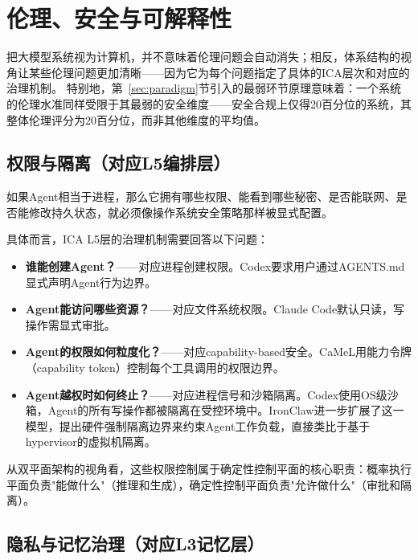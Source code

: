 \section{伦理、安全与可解释性}
\label{sec:ethics}

把大模型系统视为计算机，并不意味着伦理问题会自动消失；相反，体系结构的视角让某些伦理问题更加清晰——因为它为每个问题指定了具体的ICA层次和对应的治理机制。
特别地，第~\ref{sec:paradigm}节引入的最弱环节原理意味着：一个系统的伦理水准同样受限于其最弱的安全维度——安全合规上仅得20百分位的系统，其整体伦理评分为20百分位，而非其他维度的平均值。

\subsection{权限与隔离（对应L5编排层）}
\label{sec:ethics-permission}

如果Agent相当于进程，那么它拥有哪些权限、能看到哪些秘密、是否能联网、是否能修改持久状态，就必须像操作系统安全策略那样被显式配置\cite{openai_codex_approvals_2026,openai_codex_sandbox_2026,anthropic_claudecode_security_2026,anthropic_claudecode_sandbox_2026,debenedetti2025camel,ironclaw2025}。

具体而言，ICA L5层的治理机制需要回答以下问题：
\begin{itemize}[nosep]
\item \textbf{谁能创建Agent？}——对应进程创建权限。Codex要求用户通过AGENTS.md显式声明Agent行为边界\cite{openai_codex_agents_md_2026}。
\item \textbf{Agent能访问哪些资源？}——对应文件系统权限。Claude Code默认只读，写操作需显式审批\cite{anthropic_claudecode_security_2026}。
\item \textbf{Agent的权限如何粒度化？}——对应capability-based安全。CaMeL用能力令牌（capability token）控制每个工具调用的权限边界\cite{debenedetti2025camel}。
\item \textbf{Agent越权时如何终止？}——对应进程信号和沙箱隔离。Codex使用OS级沙箱，Agent的所有写操作都被隔离在受控环境中\cite{openai_codex_sandbox_2026}。IronClaw\cite{ironclaw2025}进一步扩展了这一模型，提出硬件强制隔离边界来约束Agent工作负载，直接类比于基于hypervisor的虚拟机隔离。
\end{itemize}

从双平面架构的视角看，这些权限控制属于确定性控制平面的核心职责：概率执行平面负责"能做什么"（推理和生成），确定性控制平面负责"允许做什么"（审批和隔离）。

\subsection{隐私与记忆治理（对应L3记忆层）}
\label{sec:ethics-privacy}

